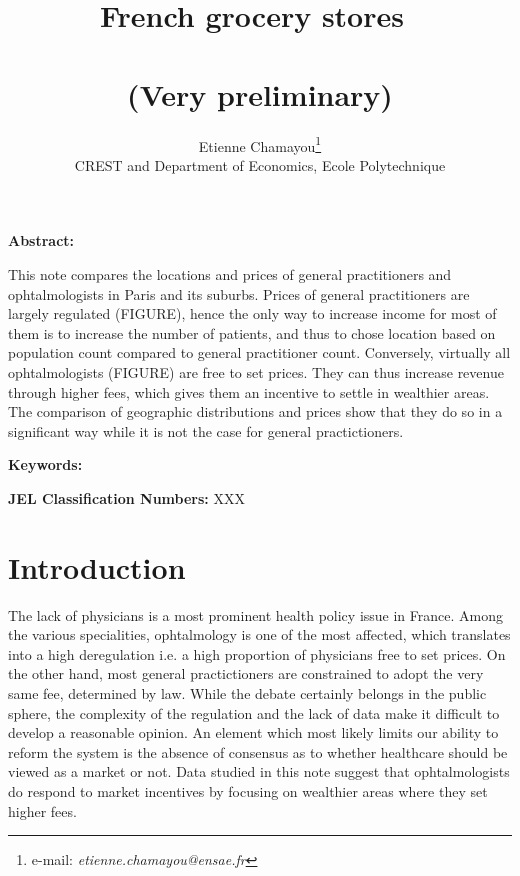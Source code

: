 \documentclass[11pt]{article}
\begin{document}
\title{French grocery stores\ \\ \ \\(Very preliminary)}
\author{Etienne Chamayou\thanks{e-mail:
\textit{etienne.chamayou@ensae.fr}}\medskip\\{\normalsize CREST and Department of Economics, Ecole Polytechnique }}
\maketitle

\sloppy%

\onehalfspacing

\textbf{Abstract:}

This note compares the locations and prices of general practitioners and ophtalmologists in Paris and its suburbs. Prices of general practitioners are largely regulated (FIGURE), hence the only way to increase income for most of them is to increase the number of patients, and thus to chose location based on population count compared to general practitioner count. Conversely, virtually all ophtalmologists (FIGURE) are free to set prices. They can thus increase revenue through higher fees, which gives them an incentive to settle in wealthier areas. The comparison of geographic distributions and prices show that they do so in a significant way while it is not the case for general practictioners.

\strut

\textbf{Keywords:}

\strut

\textbf{JEL Classification Numbers:} XXX

\pagebreak%
\doublespacing

\section{Introduction}

The lack of physicians is a most prominent health policy issue in France. Among the various specialities, ophtalmology is one of the most affected, which translates into a high deregulation i.e. a high proportion of physicians free to set prices. On the other hand, most general practictioners are constrained to adopt the very same fee, determined by law. While the debate certainly belongs in the public sphere, the complexity of the regulation and the lack of data make it difficult to develop a reasonable opinion. An element which most likely limits our ability to reform the system is the absence of consensus as to whether healthcare should be viewed as a market or not. Data studied in this note suggest that ophtalmologists do respond to market incentives by focusing on wealthier areas where they set higher fees.
\end{document}
